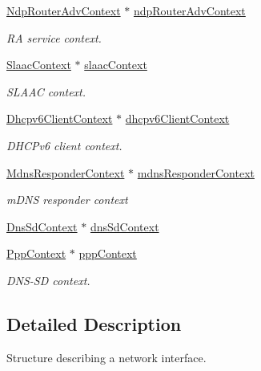 \begin{DoxyCompactItemize}
\hyperlink{structNdpRouterAdvContext}{Ndp\+Router\+Adv\+Context} $\ast$ \hyperlink{struct__NetInterface_ae33ba4d5428099fba444da6aad25f3a4}{ndp\+Router\+Adv\+Context}
\begin{DoxyCompactList}\small\item\em RA service context. \end{DoxyCompactList}\item 
\hyperlink{slaac_8h_a732edbc322eadbd3b8a4eb9574898d31}{Slaac\+Context} $\ast$ \hyperlink{struct__NetInterface_a21abce085b4de96e1375d6df541ff7c0}{slaac\+Context}
\begin{DoxyCompactList}\small\item\em S\+L\+A\+AC context. \end{DoxyCompactList}\item 
\hyperlink{dhcpv6__client_8h_aac4eb11915c8cf98cce890c9d0270c9b}{Dhcpv6\+Client\+Context} $\ast$ \hyperlink{struct__NetInterface_ad2b9fb8d43ac0f3c6bf1b74d56959ef7}{dhcpv6\+Client\+Context}
\begin{DoxyCompactList}\small\item\em D\+H\+C\+Pv6 client context. \end{DoxyCompactList}\item 
\hyperlink{mdns__responder_8h_a568880b401f701b835db7d635fb0ea38}{Mdns\+Responder\+Context} $\ast$ \hyperlink{struct__NetInterface_a63996223c6fc702f52b30fea2aa2f6b7}{mdns\+Responder\+Context}
\begin{DoxyCompactList}\small\item\em m\+D\+NS responder context \end{DoxyCompactList}\item 
\hyperlink{dns__sd_8h_a616b4c4abbffa3a360ee2f40bea72cf7}{Dns\+Sd\+Context} $\ast$ \hyperlink{struct__NetInterface_a5b3f01c67fd54aecd7bc14764dd5fb71}{dns\+Sd\+Context}
\item 
\hyperlink{ppp_8h_a896c00dd8ba8bad09b3f442b7aa5ad9c}{Ppp\+Context} $\ast$ \hyperlink{struct__NetInterface_a26328f7253cfca2971eda92c763dd72b}{ppp\+Context}
\begin{DoxyCompactList}\small\item\em D\+N\+S-\/\+SD context. \end{DoxyCompactList}\end{DoxyCompactItemize}


\subsection{Detailed Description}
Structure describing a network interface. 

